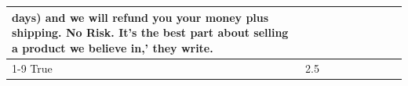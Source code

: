 \begin{table}[H]
{\begin{tabular}{lllrlllll}
days) and we will refund you your money plus shipping. No Risk. It’s the best part about selling a product we believe in,' they write.

 \\
\cline{1-9}
True & 2.5%
\end{tabular}}
\end{table}
